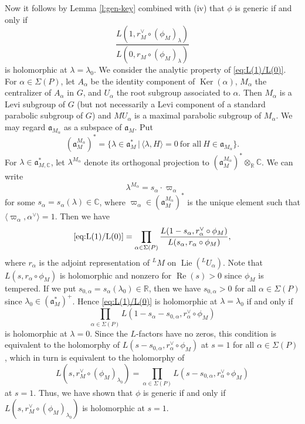 \documentclass[11pt]{amsart}
\numberwithin{equation}{section}
\theoremstyle{plain}
\theoremstyle{definition}
\theoremstyle{remark}
\def\Ker{\operatorname{Ker}}
\def\Lie{\operatorname{Lie}}
\def\Re{\operatorname{Re}}
\def\CC{\mathbb{C}}
\def\RR{\mathbb{R}}
\def\aa{\mathfrak{a}}
\begin{document}
Now it follows by Lemma \ref{l:gen-key} combined with (iv) that $\phi$ is generic if and only if
\begin{equation}
\label{eq:L(1)/L(0)}
 \frac{L(1, r_M^\vee \circ (\phi_M)_\lambda)}{L(0, r_M \circ (\phi_M)_\lambda)} 
\end{equation}
is holomorphic at $\lambda = \lambda_0$.
We consider the analytic property of \eqref{eq:L(1)/L(0)}.
For $\alpha \in \Sigma(P)$, let $A_\alpha$ be the identity component of $\Ker(\alpha)$, $M_\alpha$ the centralizer of $A_\alpha$ in $G$, and $U_\alpha$ the root subgroup associated to $\alpha$.
Then $M_\alpha$ is a Levi subgroup of $G$ (but not necessarily a Levi component of a standard parabolic subgroup of $G$) and $M U_\alpha$ is a maximal parabolic subgroup of $M_\alpha$.
We may regard $\aa_{M_\alpha}$ as a subspace of $\aa_M$.
Put
\[
 (\aa_{M}^{M_\alpha})^* = \{ \lambda \in \aa_M^* \, | \, \langle \lambda, H \rangle = 0 \ \text{for all} \ H \in \aa_{M_\alpha} \}.
\]
For $\lambda \in \aa_{M,\CC}^*$, let $\lambda^{M_\alpha}$ denote its orthogonal projection to $(\aa_M^{M_\alpha})^* \otimes_\RR \CC$.
We can write
\[
 \lambda^{M_\alpha} = s_\alpha \cdot \varpi_\alpha 
\]
for some $s_\alpha = s_\alpha(\lambda) \in \CC$, where $\varpi_\alpha \in (\aa_{M}^{M_\alpha})^*$ is the unique element such that $\langle \varpi_\alpha, \alpha^\vee \rangle = 1$.
Then we have
\[
 \eqref{eq:L(1)/L(0)} = 
 \prod_{\alpha \in \Sigma(P)} \frac{L(1 - s_\alpha, r_\alpha^\vee \circ \phi_M)}{L(s_\alpha, r_\alpha \circ \phi_M)},
\]
where $r_\alpha$ is the adjoint representation of ${}^L M$ on $\Lie({}^L U_\alpha)$.
Note that $L(s, r_\alpha \circ \phi_M)$ is holomorphic and nonzero for $\Re(s) > 0$ since $\phi_M$ is tempered.
If we put $s_{0,\alpha} = s_\alpha(\lambda_0) \in \RR$, then we have $s_{0,\alpha} > 0$ for all $\alpha \in \Sigma(P)$ since $\lambda_0 \in (\aa^*_M)^+$.
Hence \eqref{eq:L(1)/L(0)} is holomorphic at $\lambda = \lambda_0$ if and only if
\[
 \prod_{\alpha \in \Sigma(P)} L(1 - s_\alpha - s_{0,\alpha}, r_\alpha^\vee \circ \phi_M)
\]
is holomorphic at $\lambda = 0$.
Since the $L$-factors have no zeros, this condition is equivalent to the holomorphy of $L(s - s_{0,\alpha}, r_\alpha^\vee \circ \phi_M)$ at $s=1$ for all $\alpha \in \Sigma(P)$, which in turn is equivalent to the holomorphy of
\[
 L(s, r_M^\vee \circ (\phi_M)_{\lambda_0}) = \prod_{\alpha \in \Sigma(P)}  L(s - s_{0,\alpha}, r_\alpha^\vee \circ \phi_M)  
\]
at $s=1$.
Thus, we have shown that $\phi$ is generic if and only if $L(s, r_M^\vee \circ (\phi_M)_{\lambda_0})$ is holomorphic at $s=1$.
\end{document}
